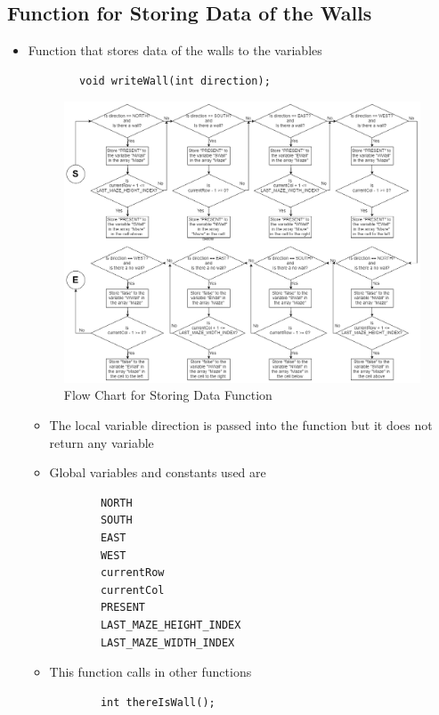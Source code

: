 \documentclass[11pt]{article}
\begin{document}
\subsection{Function for Storing Data of the Walls}
\begin{itemize}
\item Function that stores data of the walls to the variables
	\begin{verbatim}
		void writeWall(int direction);
	\end{verbatim}
\begin{figure}[htp]
\centering
\includegraphics[scale=0.41]{images/Software_Flowchart/writeWall.png}
\caption{Flow Chart for Storing Data Function}
\label{}
\end{figure}
	\begin{itemize}
	\item The local variable direction is passed into the function but it does not return any variable
	\item Global variables and constants used are
	\begin{verbatim}
		NORTH
		SOUTH
		EAST
		WEST
		currentRow
		currentCol
		PRESENT
		LAST_MAZE_HEIGHT_INDEX
		LAST_MAZE_WIDTH_INDEX
	\end{verbatim}
	\item This function calls in other functions 
	\begin{verbatim}
		int thereIsWall();
	\end{verbatim}
	\end{itemize}
\end{itemize}
\newpage
\end{document}
